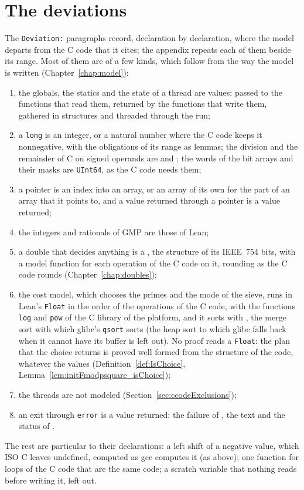 \section{The deviations}\label{sec:ccodeDeviations}

The \verb|Deviation:| paragraphs record, declaration by declaration, where the model departs from
the C code that it cites; the appendix repeats each of them beside its range. Most of them are of a
few kinds, which follow from the way the model is written (Chapter~\ref{chap:model}):
\begin{enumerate}
  \item the globals, the statics and the state of a thread are values: passed to the functions that
    read them, returned by the functions that write them, gathered in structures and threaded
    through the run;
  \item a \verb|long| is an integer, or a natural number where the C code keeps it nonnegative, with
    the obligations of its range as lemmas; the division and the remainder of C on signed operands
    are  and ; the words of the bit arrays and their masks are
    \verb|UInt64|, as the C code needs them;
  \item a pointer is an index into an array, or an array of its own for the part of an array that it
    points to, and a value returned through a pointer is a value returned;
  \item the integers and rationals of GMP are those of Lean;
  \item a double that decides anything is a , the structure of its IEEE~754
    bits, with a model function for each operation of the C code on it, rounding as the C code
    rounds (Chapter~\ref{chap:doubles});
  \item the cost model, which chooses the primes and the mode of the sieve, runs in Lean's
    \verb|Float| in the order of the operations of the C code, with the functions \verb|log| and
    \verb|pow| of the C library of the platform, and it sorts with , the merge
    sort with which glibc's \verb|qsort| sorts (the heap sort to which glibc falls back when it
    cannot have its buffer is left out). No proof reads a \verb|Float|: the plan that the choice
    returns is proved well formed from the structure of the code, whatever the values
    (Definition~\ref{def:IsChoice}, Lemma~\ref{lem:initFmodpsquare_isChoice});
  \item the threads are not modeled (Section~\ref{sec:ccodeExclusions});
  \item an exit through \verb|error| is a value returned: the failure of
    , the text and the status of .
\end{enumerate}
The rest are particular to their declarations: a left shift of a negative value, which ISO C leaves
undefined, computed as gcc computes it (as above); one function for loops of the C code that are the
same code; a scratch variable that nothing reads before writing it, left out.

